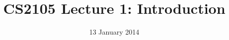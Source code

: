 \documentclass[20pt,xcolor={dvipsnames,svgnames,tables},notes=hide]{beamer}
\begin{document}
\title{CS2105 Lecture 1: Introduction}
\date{13 January 2014} 


\end{document}
